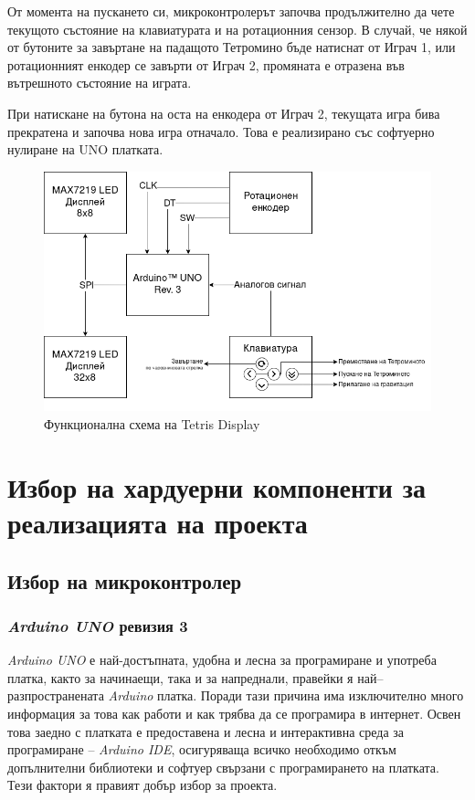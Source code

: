 \documentclass[titlepage, oneside, 14pt]{extbook}
\newcommand{\ard}{Arduino\texttrademark{}}
\begin{document}
От момента на пускането си, микроконтролерът започва продължително да чете
текущото състояние на клавиатурата и на ротационния сензор. В случай, че някой
от бутоните за завъртане на падащото Тетромино бъде натиснат от Играч 1, или
ротационният енкодер се завърти от Играч 2, промяната е отразена във вътрешното
състояние на играта.

При натискане на бутона на оста на енкодера от Играч 2, текущата игра бива прекратена и
започва нова игра отначало. Това е реализирано със софтуерно нулиране на UNO платката.

\begin{figure}[!htbp]
    \centering
    \includegraphics[width=0.5\linewidth]{img/functional_diagram.drawio.png}
    \caption{Функционална схема на Tetris Display}
\end{figure}


\section{Избор на хардуерни компоненти за реализацията на проекта}

\subsection{Избор на микроконтролер}

\subsubsection{\textit{\ard{} UNO} ревизия 3}

\textit{\ard{} UNO} \cite{arduino} е най-достъпната, удобна и лесна за програмиране и
употреба платка, както за начинаещи, така и за напреднали, правейки я
най–разпространената \textit{\ard{}} платка. Поради тази причина има
изключително много информация за това как работи и как трябва да се
програмира в интернет. Освен това заедно с платката е предоставена и лесна
и интерактивна среда за програмиране -- \textit{\ard{} IDE}, осигуряваща всичко
необходимо откъм допълнителни библиотеки и софтуер свързани с
програмирането на платката. Тези фактори я правият добър избор за
проекта.
\end{document}
